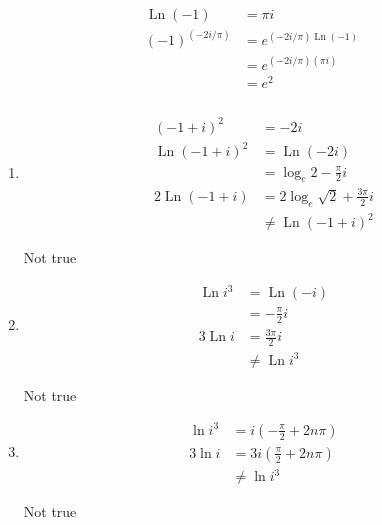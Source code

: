 \documentclass{article}
\newcommand{\Ln}{\operatorname{Ln}}
\begin{document}
\setcounter{subsubsection}{42}
\subsubsection{}

\begin{align*}
  \Ln (-1)            & = \pi i                     \\
  (-1)^{(-2 i / \pi)} & = e^{(-2 i / \pi) \Ln (-1)} \\
                      & = e^{(-2 i / \pi) (\pi i)}  \\
                      & = e^2
\end{align*}

\setcounter{subsubsection}{46}
\subsubsection{}

\begin{enumerate}
  \item

        \begin{align*}
          (-1 + i)^2     & = -2 i                                  \\
          \Ln (-1 + i)^2 & = \Ln (-2 i)                            \\
                         & = \log_e 2 - \frac{\pi}{2} i            \\
          2 \Ln (-1 + i) & = 2 \log_e \sqrt{2} + \frac{3 \pi}{2} i \\
                         & \ne \Ln (-1 + i)^2
        \end{align*}

        Not true

  \item

        \begin{align*}
          \Ln i^3 & = \Ln (-i)          \\
                  & = -\frac{\pi}{2} i  \\
          3 \Ln i & = \frac{3 \pi}{2} i \\
                  & \ne \Ln i^3
        \end{align*}

        Not true

  \item

        \begin{align*}
          \ln i^3 & = i \left( -\frac{\pi}{2} + 2 n \pi \right)  \\
          3 \ln i & = 3 i \left( \frac{\pi}{2} + 2 n \pi \right) \\
                  & \ne \ln i^3
        \end{align*}

        Not true
\end{enumerate}
\end{document}
